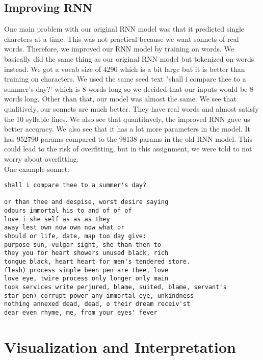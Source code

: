 \subsection{Improving RNN}
One main problem with our original RNN model was that it predicted single charcters at a time. This was not practical because we want sonnets of real words. Therefore, we improved our RNN model by training on words. We basically did the same thing as our original RNN model but tokenized on words instead. We got a vocab size of 4290 which is a bit large but it is better than training on characters. We used the same seed text "shall i compare thee to a summer's day?' which is 8 words long so we decided that our inputs would be 8 words long. Other than that, our model was almost the same. We see that qualitively, our sonnets are much better. They have real words and almost satisfy the 10 syllable lines. We also see that quantitavely, the improved RNN gave us better accuracy. We also see that it has a lot more parameters in the model. It has 952790 params compared to the 98138 params in the old RNN model. This could lead to the risk of overfitting, but in this assignment, we were told to not worry about overfitting. \\
One example sonnet:
\begin{verbatim}
shall i compare thee to a summer's day?

or than thee and despise, worst desire saying
odours immortal his to and of of of
love i she self as as as they
away lest own now own now what or
should or life, date, map too day give:
purpose sun, vulgar sight, she than then to
they you for heart showers unused black, rich
tongue black, heart heart for men's tendered store.
flesh) process simple been pen are thee, love
love eye, twire process only longer only main
took services write perjured, blame, suited, blame, servant's
star pen) corrupt power any immortal eye, unkindness
nothing annexed dead, dead, o their dream receiv'st
dear even rhyme, me, from your eyes' fever
\end{verbatim}

\newpage

\section{Visualization and Interpretation}
\medskip

